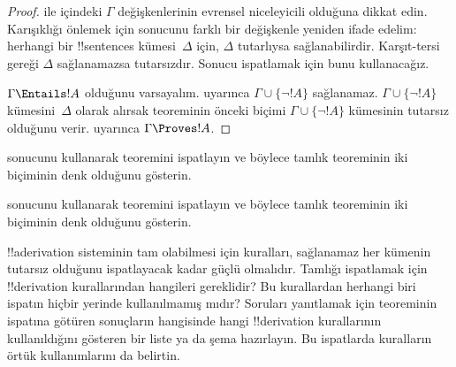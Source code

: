 \documentclass[../../../include/open-logic-section]{subfiles}
\begin{document}
\begin{proof}
 ile  içindeki
$\Gamma$ değişkenlerinin evrensel niceleyicili olduğuna dikkat edin.
Karışıklığı önlemek için  sonucunu farklı bir
değişkenle yeniden ifade edelim: herhangi bir !!{sentence}s
kümesi~$\Delta$ için, $\Delta$ tutarlıysa sağlanabilirdir. Karşıt-tersi
gereği $\Delta$ sağlanamazsa tutarsızdır. Sonucu ispatlamak için
bunu kullanacağız.

$\Gamma\Entails !A$ olduğunu varsayalım.
 uyarınca
$\Gamma\cup\{\lnot !A\}$ sağlanamaz. $\Gamma\cup\{\lnot !A\}$
kümesini~$\Delta$ olarak alırsak  teoreminin
önceki biçimi $\Gamma\cup\{\lnot !A\}$ kümesinin tutarsız olduğunu verir.
uyarınca $\Gamma\Proves !A$.
\end{proof}

\begin{prob}
 sonucunu kullanarak
 teoremini ispatlayın ve böylece
tamlık teoreminin iki biçiminin denk olduğunu gösterin.
\end{prob}
\tagendprob

\begin{prob}
 sonucunu kullanarak
 teoremini ispatlayın ve böylece
tamlık teoreminin iki biçiminin denk olduğunu gösterin.
\end{prob}
\tagendprob

\begin{prob}
!!a{derivation} sisteminin tam olabilmesi için kuralları, sağlanamaz
her kümenin tutarsız olduğunu ispatlayacak kadar güçlü olmalıdır.
Tamlığı ispatlamak için !!{derivation} kurallarından hangileri
gereklidir? Bu kurallardan herhangi biri ispatın hiçbir yerinde
kullanılmamış mıdır? Soruları yanıtlamak için
 teoreminin ispatına götüren
sonuçların hangisinde hangi !!{derivation} kurallarının kullanıldığını
gösteren bir liste ya da şema hazırlayın. Bu ispatlarda kuralların
örtük kullanımlarını da belirtin.
\end{prob}
\tagendprob
\end{document}
